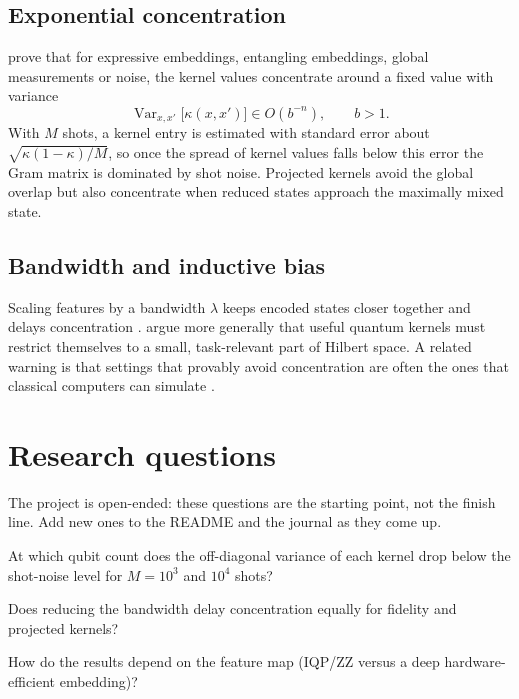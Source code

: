 \documentclass[11pt,a4paper]{article}
\begin{document}
\subsection{Exponential concentration}
\citet{thanasilp2024} prove that for expressive embeddings, entangling embeddings, global
measurements or noise, the kernel values concentrate around a fixed value with variance
\begin{equation}
  \operatorname{Var}_{x,x'}\big[\kappa(x,x')\big]\in O(b^{-n}),\qquad b>1 .
\end{equation}
With $M$ shots, a kernel entry is estimated with standard error about $\sqrt{\kappa(1-\kappa)/M}$, so
once the spread of kernel values falls below this error the Gram matrix is dominated by shot noise.
Projected kernels avoid the global overlap but also concentrate when reduced states approach the
maximally mixed state.

\subsection{Bandwidth and inductive bias}
Scaling features by a bandwidth $\lambda$ keeps encoded states closer together and delays
concentration \citep{shaydulin2022}. \citet{kubler2021} argue more generally that useful quantum
kernels must restrict themselves to a small, task-relevant part of Hilbert space. A related warning
is that settings that provably avoid concentration are often the ones that classical computers can
simulate \citep{cerezo2023simulability}.

\section{Research questions}
The project is open-ended: these questions are the starting point, not the finish line. Add new
ones to the README and the journal as they come up.

\begin{rqlist}
  \item At which qubit count does the off-diagonal variance of each kernel drop below the shot-noise level for $M=10^3$ and $10^4$ shots?
  \item Does reducing the bandwidth delay concentration equally for fidelity and projected kernels?
  \item How do the results depend on the feature map (IQP/ZZ versus a deep hardware-efficient embedding)?
\end{rqlist}
\end{document}
